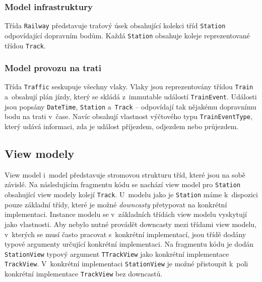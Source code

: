 \subsubsection*{Model infrastruktury}
Třída \texttt{Railway} představuje traťový úsek obsahující kolekci tříd \texttt{Station} odpovídající dopravním bodům. Každá \texttt{Station} obsahuje koleje reprezentované třídou \texttt{Track}.

\subsubsection*{Model provozu na trati}
Třída \texttt{Traffic} seskupuje všechny vlaky. Vlaky jsou reprezentovány třídou \texttt{Train} a~obsahují plán jízdy, který se skládá z~immutable událostí \texttt{TrainEvent}. Události jsou popsány \texttt{DateTime}, \texttt{Station} a~\texttt{Track} -- odpovídají tak nějakému dopravnímu bodu na trati v~čase. Navíc obsahují vlastnost výčtového typu \linebreak\texttt{TrainEventType}, který udává informaci, zda je událost příjezdem, odjezdem nebo průjezdem.

\subsection{View modely}
View model i~model představuje stromovou strukturu tříd, které jsou na sobě závislé. Na následujícím fragmentu kódu se nachází view model pro \texttt{Station} obsahující view modely kolejí \texttt{Track}. U~modelu jako je \texttt{Station} máme k~dispozici pouze základní třídy, které je možné \textit{downcasty} přetypovat na konkrétní implementaci. Instance modelu se v~základních třídách view modelu vyskytují jako vlastnosti. Aby nebylo nutné provádět downcasty mezi třídami view modelu, v~kterých se musí často pracovat s~konkrétní implementací, jsou třídě dodány typové argumenty určující konkrétní implementaci. Na fragmentu kódu je dodán \texttt{StationView} typový argument  \texttt{TTrackView} jako konkrétní implementace \texttt{TrackView}. V~konkrétní implementaci \texttt{StationView} je možné přistoupit k~poli konkrétní implementace \texttt{TrackView} bez downcastů.

\begin{csharpcode}
public class StationView<TTrackView> : InfrastructureViewElement 
   where TTrackView : TrackView {

	public Station Station { get; }
	public ImmutableArray<TTrackView> TrackViews { get; }
\end{csharpcode}

